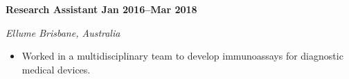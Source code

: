 \textbf{Research Assistant \hfill Jan 2016--Mar 2018}\par
\textit{Ellume \hfill Brisbane, Australia}\par
\begin{itemize}
	\item Worked in a multidisciplinary team to develop immunoassays for diagnostic medical devices.
\end{itemize}\par